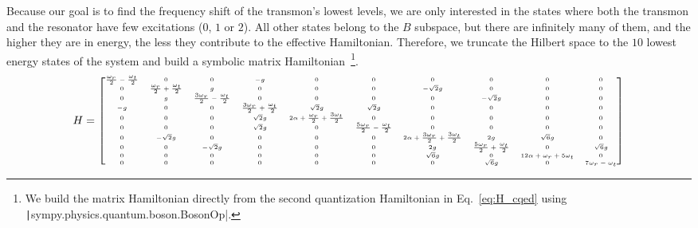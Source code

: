 Because our goal is to find the frequency shift of the transmon's lowest
levels, we are only interested in the states where both the transmon and the
resonator have few excitations ($0$, $1$ or $2$).
All other states belong to the $B$ subspace, but there are infinitely many of
them, and the higher they are in energy, the less they contribute to the
effective Hamiltonian.
Therefore, we truncate the Hilbert space to the $10$ lowest energy states of
the system and build a symbolic matrix Hamiltonian~\footnote{We build the matrix
Hamiltonian directly from the second quantization Hamiltonian in
Eq.~\eqref{eq:H_cqed} using
\texttt|sympy.physics.quantum.boson.BosonOp|.}.
%
\begin{equation}
    \label{eq:H_cqed_matrix}
    {\tiny
    H =
    \left[
        \begin{matrix}
            \frac{\omega_{r}}{2} - \frac{\omega_{t}}{2} & 0 & 0 & - g & 0 & 0 & 0 & 0 & 0 & 0\\
            0 & \frac{\omega_{r}}{2} + \frac{\omega_{t}}{2} & g & 0 & 0 & 0 & - \sqrt{2} g & 0 & 0 & 0\\
            0 & g & \frac{3 \omega_{r}}{2} - \frac{\omega_{t}}{2} & 0 & 0 & 0 & 0 & - \sqrt{2} g & 0 & 0\\
            - g & 0 & 0 & \frac{3 \omega_{r}}{2} + \frac{\omega_{t}}{2} & \sqrt{2} g & \sqrt{2} g & 0 & 0 & 0 & 0\\
            0 & 0 & 0 & \sqrt{2} g & 2 \alpha + \frac{\omega_{r}}{2} + \frac{3 \omega_{t}}{2} & 0 & 0 & 0 & 0 & 0\\
            0 & 0 & 0 & \sqrt{2} g & 0 & \frac{5 \omega_{r}}{2} - \frac{\omega_{t}}{2} & 0 & 0 & 0 & 0\\
            0 & - \sqrt{2} g & 0 & 0 & 0 & 0 & 2 \alpha + \frac{3 \omega_{r}}{2} + \frac{3 \omega_{t}}{2} & 2 g & \sqrt{6} g & 0\\
            0 & 0 & - \sqrt{2} g & 0 & 0 & 0 & 2 g & \frac{5 \omega_{r}}{2} + \frac{\omega_{t}}{2} & 0 & \sqrt{6} g\\
            0 & 0 & 0 & 0 & 0 & 0 & \sqrt{6} g & 0 & 12 \alpha + \omega_{r} + 5 \omega_{t} & 0\\
            0 & 0 & 0 & 0 & 0 & 0 & 0 & \sqrt{6} g & 0 & 7 \omega_{r} - \omega_{t}
        \end{matrix}
    \right]
    }
\end{equation}
%

